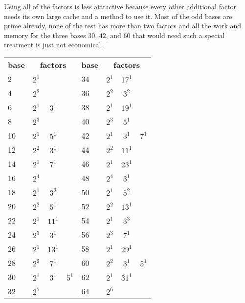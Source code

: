 \documentclass[a4paper,10pt]{article}
\theoremstyle{plain} %
\theoremstyle{definition}
\theoremstyle{remark}
\begin{document}
Using all of the factors is less attractive because every other additional factor needs its own large cache and a method to use it. Most of the odd bases are prime already, none of the rest has more than two factors and all the work and memory for the three bases $30$, $42$, and $60$ that would need such a special treatment is just not economical.
\begin{table}[H]
\begin{center}
\begin{tabular}{l c c c l c c c}
\textbf{base}&\multicolumn{3}{c}{\textbf{factors}}&\textbf{base}&\multicolumn{3}{c}{\textbf{factors}} \\
2  & $ 2^1 $&        &         & 34 & $ 2^1 $&$ 17^1 $& 	       \\
4  & $ 2^2 $&        &         & 36 & $ 2^2 $&$ 3^2 $ & 	       \\
6  & $ 2^1 $&$ 3^1 $ &         & 38 & $ 2^1 $&$ 19^1 $& 	       \\
8  & $ 2^3 $&        &         & 40 & $ 2^3 $&$ 5^1 $ & 	       \\
10 & $ 2^1 $&$ 5^1 $ &         & 42 & $ 2^1 $&$ 3^1 $ &$  7^1 $        \\
12 & $ 2^2 $&$ 3^1 $ &         & 44 & $ 2^2 $&$ 11^1 $& 	       \\
14 & $ 2^1 $&$ 7^1 $ &         & 46 & $ 2^1 $&$ 23^1 $& 	       \\
16 & $ 2^4 $&        &         & 48 & $ 2^4 $&$ 3^1 $ & 	       \\
18 & $ 2^1 $&$ 3^2 $ &         & 50 & $ 2^1 $&$ 5^2 $ & 	       \\
20 & $ 2^2 $&$ 5^1 $ &         & 52 & $ 2^2 $&$ 13^1 $& 	       \\
22 & $ 2^1 $&$ 11^1 $&         & 54 & $ 2^1 $&$ 3^3 $ & 	       \\
24 & $ 2^3 $&$ 3^1 $ &         & 56 & $ 2^3 $&$ 7^1 $ & 	       \\
26 & $ 2^1 $&$ 13^1 $&         & 58 & $ 2^1 $&$ 29^1 $& 	       \\
28 & $ 2^2 $&$ 7^1 $ &         & 60 & $ 2^2 $&$ 3^1 $ &$  5^1 $        \\
30 & $ 2^1 $&$ 3^1 $ &$  5^1 $ & 62 & $ 2^1 $&$ 31^1 $& 	       \\
32 & $ 2^5 $&&                 & 64 & $ 2^6 $&         &
\end{tabular}
\label{tab:factoreven}
\end{center}
\end{table}
\end{document}
